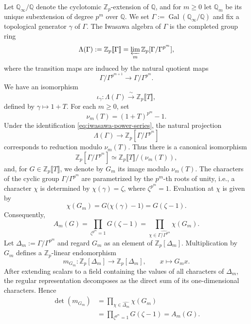 \documentclass[11pt,table]{amsart}
\newcommand{\Q}{\mathbb{Q}}
\numberwithin{equation}{section}
\begin{document}
\par Let $\mathbb Q_\infty/\mathbb Q$ denote the cyclotomic \(\mathbb Z_p\)-extension of $\Q$, and for \(m\geq0\) let
\(\mathbb Q_m\) be its unique subextension of degree \(p^m\) over
\(\mathbb Q\). We set $\Gamma
        :=
        \operatorname{Gal}(\mathbb Q_\infty/\mathbb Q)$ and fix a topological generator \(\gamma\) of \(\Gamma\).  The Iwasawa algebra
of \(\Gamma\) is the completed group ring
\[
        \Lambda(\Gamma)
        :=
        \mathbb Z_p\llbracket\Gamma\rrbracket
        =
        \varprojlim_m
        \mathbb Z_p[\Gamma/\Gamma^{p^m}],
\]
where the transition maps are induced by the natural quotient maps
\[
        \Gamma/\Gamma^{p^{m+1}}
        \longrightarrow
        \Gamma/\Gamma^{p^m}.
\]
We have an isomorphism
\begin{equation}\label{eq:iwasawa-power-series}
\iota_\gamma:\Lambda(\Gamma)
\xrightarrow{\;\sim\;}
\mathbb Z_p\llbracket T\rrbracket,
\end{equation}
defined by $\gamma\longmapsto 1+T$. For each \(m\geq 0\), set
\[
\nu_m(T)=(1+T)^{p^m}-1.
\]
Under the identification \eqref{eq:iwasawa-power-series}, the natural
projection
\[
\Lambda(\Gamma)\longrightarrow
\mathbb Z_p[\Gamma/\Gamma^{p^m}]
\]
corresponds to reduction modulo \(\nu_m(T)\).  Thus there is a canonical
isomorphism
\[
\mathbb Z_p[\Gamma/\Gamma^{p^m}]
\simeq
\mathbb Z_p\llbracket T\rrbracket/(\nu_m(T)),
\]
and, for \(G\in\mathbb Z_p\llbracket T\rrbracket\), we denote by
\(G_m\) its image modulo \(\nu_m(T)\).  The characters of the cyclic group
\(\Gamma/\Gamma^{p^m}\) are parametrized by the \(p^m\)-th roots of
unity, i.e., a character \(\chi\) is determined by $\chi(\gamma)=\zeta$, where $\zeta^{p^m}=1$.
Evaluation at
\(\chi\) is given by
\[
        \chi(G_m)
        =
        G\bigl(\chi(\gamma)-1\bigr)
        =
        G(\zeta-1).
\]
Consequently,
\[
        A_m(G)
        =
        \prod_{\zeta^{p^m}=1}G(\zeta-1)
        =
        \prod_{\chi\in
        \widehat{\Gamma/\Gamma^{p^m}}}\chi(G_m).
\]
Let $\Delta_m:=\Gamma/\Gamma^{p^m}$ and regard \(G_m\) as an element of \(\mathbb Z_p[\Delta_m]\).
Multiplication by \(G_m\) defines a \(\mathbb Z_p\)-linear endomorphism
\[
        m_{G_m}:
        \mathbb Z_p[\Delta_m]
        \longrightarrow
        \mathbb Z_p[\Delta_m],
        \qquad
        x\longmapsto G_mx.
\]
After extending scalars to a field containing the values of all characters
of \(\Delta_m\), the regular representation decomposes as the direct sum of
its one-dimensional characters.  Hence
\[
\begin{aligned}
        \det(m_{G_m})
        &=
        \prod_{\chi\in\widehat{\Delta_m}}\chi(G_m)\\
        &=
        \prod_{\zeta^{p^m}=1}G(\zeta-1)
        =
        A_m(G).
\end{aligned}
\]
\end{document}
